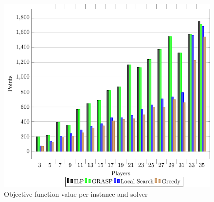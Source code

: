 \documentclass[a4paper, 10pt]{article}
\begin{document}
\begin{figure}[H]
    \includegraphics[width=\linewidth]{plots/solutions.pdf}
    \caption{Objective function value per instance and solver}
    \label{fig:objfunc}
\end{figure}
\end{document}
